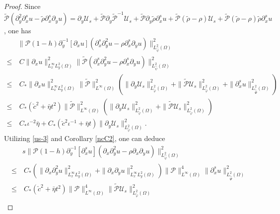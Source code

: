 \documentclass{amsart}
\numberwithin{equation}{section}
\begin{document}
\begin{proof}
Since
$\tilde{\mathcal{P}}(\partial_{y}^{2}\partial_{x}^{s}u-\tilde{\rho}\partial_{x}^{s}\partial_{y}u)
=\partial_{y}\mathcal{U}_{s}
+\tilde{\mathcal{P}}\partial_{y}\tilde{\mathcal{P}}^{-1}\mathcal{U}_{s}
+\tilde{\mathcal{P}}\partial_{y}\tilde{\rho}\partial_{x}^{s}u
+\tilde{\mathcal{P}}(\tilde{\rho}-\rho)\mathcal{U}_{s}
+\tilde{\mathcal{P}}(\tilde{\rho}-\rho)\tilde{\rho}\partial_{x}^{s}u$,
one has
\begin{align}\label{pm23}
&\|\mathcal{P}(1-h)\partial_{y}^{-1}[\partial_{x}u](\partial_{x}^{s}\partial_{y}^{2}u-\rho\partial_{x}^{s}\partial_{y}u)\|_{L_{\hat{\psi}}^{2}(\Omega)}^{2}\\
\leq&~C\|\partial_{x}u\|_{L_{x}^{\infty}L_{y}^{2}(\Omega)}^{2}\|\tilde{\mathcal{P}}(\partial_{x}^{s}\partial_{y}^{2}u-\rho\partial_{x}^{s}\partial_{y}u)\|_{L_{\hat{\psi}}^{2}(\Omega)}^{2}\nonumber\\
\leq&~C_{*}\|\partial_{x}u\|_{L_{x}^{\infty}L_{y}^{2}(\Omega)}^{2}\|\tilde{\mathcal{P}}\|_{L^{\infty}(\Omega)}^{2}
       (\|\partial_{y}\mathcal{U}_{s}\|_{L_{\tilde{\varphi}}^{2}(\Omega)}^{2}
        +\|\tilde{\mathcal{P}}\mathcal{U}_{s}\|_{L_{\tilde{\varphi}}^{2}(\Omega)}^{2}
        +\|\partial_{x}^{s}u\|_{L_{\tilde{\hat{\Psi}}}^{2}(\Omega)}^{2})\nonumber\\
\leq&~C_{*}(\check{c}^{2}+\bar{\eta}t^{2})\|\tilde{\mathcal{P}}\|_{L^{\infty}(\Omega)}^{2}
       (\|\partial_{y}\mathcal{U}_{s}\|_{L_{\tilde{\varphi}}^{2}(\Omega)}^{2}+\|\tilde{\mathcal{P}}\mathcal{U}_{s}\|_{L_{\tilde{\varphi}}^{2}(\Omega)}^{2})\nonumber\\
\leq&~C_{*}\iota^{-2}\bar{\eta}
     +C_{*}(\check{c}^{2}\iota^{-1}+\bar{\eta}t)\|\partial_{y}\mathcal{U}_{s}\|_{L_{\tilde{\varphi}}^{2}(\Omega)}^{2}.\nonumber
\end{align}
Utilizing \eqref{us-3} and Corollary \ref{ncC2}, one can deduce
\begin{align}\label{pm24}
&s\|\mathcal{P}(1-h)\partial_{y}^{-1}[\partial_{x}^{s}u](\partial_{x}\partial_{y}^{2}u-\rho\partial_{x}\partial_{y}u)\|_{L_{\hat{\psi}}^{2}(\Omega)}^{2}\\
\leq&~C_{*}\left(\|\partial_{x}\partial_{y}^{2}u\|_{L_{x}^{\infty}L_{y}^{2}(\Omega)}^{2}+\|\partial_{x}\partial_{y}u\|_{L_{x}^{\infty}L_{y}^{2}(\Omega)}^{2}\right)
        \|\mathcal{P}\|_{L^{\infty}(\Omega)}^{4}\|\partial_{x}^{s}u\|_{L_{\tilde{\hat{\Psi}}}^{2}(\Omega)}^{2}\nonumber\\
\leq&~C_{*}(\check{c}^{2}+\bar{\eta}t^{2})\|\mathcal{P}\|_{L^{\infty}(\Omega)}^{4}\|\tilde{\mathcal{P}}\mathcal{U}_{s}\|_{L_{\tilde{\varphi}}^{2}(\Omega)}^{2}\nonumber\\

\end{align}
\end{proof}
\end{document}

